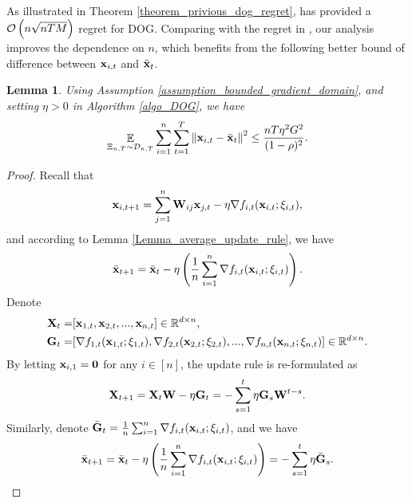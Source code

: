 \documentclass{article}
\newtheorem{Lemma}{\bf{Lemma}}
\begin{document}
As illustrated in Theorem \ref{theorem_privious_dog_regret},   \citet{8015179Shahram} has provided a ${\mathcal{O}\left( n\sqrt{nTM} \right)}$ regret for DOG. Comparing with the regret in \citet{8015179Shahram}, our analysis improves the dependence on $n$, which benefits from the following better bound of difference between ${\bf x}_{i,t}$ and $\bar{{\bf x}}_t$.
\begin{Lemma}
\label{Lemma_x_variance_norm_square}
Using Assumption \ref{assumption_bounded_gradient_domain}, and setting $\eta>0$ in Algorithm \ref{algo_DOG}, we have 
\begin{align}
\nonumber
\mathop{\mathbb{E}}_{ \Xi_{n,T} \sim \mathcal{D}_{n,T} } \sum_{i=1}^n\sum_{t=1}^T \left\lVert{\bf x}_{i,t} - \bar{{\bf x}}_t\right\rVert^2 \le \frac{nT\eta^2 G^2 }{(1-\rho)^2}.
\end{align}
\end{Lemma}
\begin{proof}
Recall that 
\begin{align}
\nonumber
{\bf x}_{i,t+1} = \sum_{j=1}^n {\bf W}_{ij}{\bf x}_{j,t} - \eta \nabla f_{i,t}({\bf x}_{i,t};\xi_{i,t}), 
\end{align} and according to Lemma \ref{Lemma_average_update_rule}, we have 
\begin{align}
\nonumber
\bar{{\bf x}}_{t+1} = \bar{{\bf x}}_t - \eta \left( \frac{1}{n}\sum_{i=1}^n \nabla f_{i,t}({\bf x}_{i,t};\xi_{i,t}) \right).
\end{align} Denote
\begin{align}
\nonumber
{\bf X}_t = &  [{\bf x}_{1,t}, {\bf x}_{2,t}, ..., {\bf x}_{n,t}] \in \mathbb{R}^{d\times n}, \\ \nonumber
{\bf G}_t = & [\nabla f_{1,t}({\bf x}_{1,t};\xi_{1,t}), \nabla f_{2,t}({\bf x}_{2,t};\xi_{2,t}), ..., \nabla f_{n,t}({\bf x}_{n,t};\xi_{n,t})] \in \mathbb{R}^{d\times n}.
\end{align} By letting ${\bf x}_{i,1} = {\bf 0}$ for any $i\in[n]$, the update rule is re-formulated as 
\begin{align}
\nonumber
{\bf X}_{t+1} = {\bf X}_t {\bf W} - \eta {\bf G}_t = - \sum_{s=1}^t \eta {\bf G}_s {\bf W}^{t-s}. 
\end{align} Similarly, denote $\bar{{\bf G}}_t = \frac{1}{n}\sum_{i=1}^n \nabla f_{i,t}({\bf x}_{i,t};\xi_{i,t})$, and we have
\begin{align*}
\bar{{\bf x}}_{t+1} = \bar{{\bf x}}_t - \eta \left( \frac{1}{n}\sum_{i=1}^n \nabla f_{i,t}({\bf x}_{i,t};\xi_{i,t}) \right) = - \sum_{s=1}^t \eta \bar{{\bf G}}_s. 
\end{align*}


\end{proof}
\end{document}
